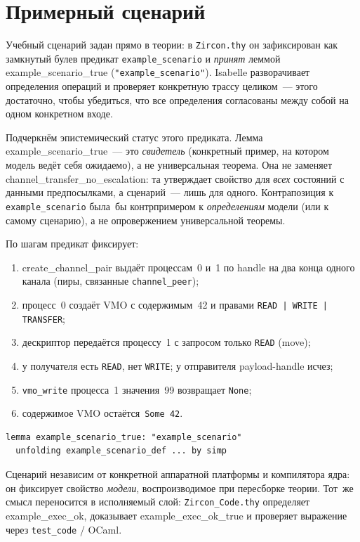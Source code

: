 \documentclass[11pt,a4paper]{article}
\newcommand{\isabel}[1]{{\isabelleit #1}}
\newcommand{\lemmaname}[1]{\isabel{#1}}
\begin{document}
\section{Примерный сценарий}

Учебный сценарий задан прямо в теории: в \texttt{Zircon.thy} он
зафиксирован как замкнутый булев предикат \texttt{example\_scenario}
и \emph{принят} леммой \lemmaname{example\_scenario\_true}
(\texttt{"example\_scenario"}). Isabelle разворачивает определения
операций и проверяет конкретную трассу целиком~--- этого достаточно,
чтобы убедиться, что все определения согласованы между собой на
одном конкретном входе.

Подчеркнём эпистемический статус этого предиката. Лемма
\lemmaname{example\_scenario\_true}~--- это \emph{свидетель}
(конкретный пример, на котором модель ведёт себя ожидаемо), а не
универсальная теорема. Она не заменяет
\lemmaname{channel\_transfer\_no\_escalation}: та утверждает свойство
для \emph{всех} состояний с данными предпосылками, а сценарий~---
лишь для одного. Контрапозиция к \texttt{example\_scenario} была~бы
контрпримером к \emph{определениям} модели (или к самому сценарию),
а не опровержением универсальной теоремы.

По шагам предикат фиксирует:
\begin{enumerate}[leftmargin=1.4em]
	\item \lemmaname{create\_channel\_pair} выдаёт процессам~0 и~1 по handle
	      на два конца одного канала (пиры, связанные \texttt{channel\_peer});
	\item процесс~0 создаёт VMO с содержимым~42 и правами
	      \texttt{READ\,|\,WRITE\,|\,TRANSFER};
	\item дескриптор передаётся процессу~1 с запросом только
	      \texttt{READ} (move);
	\item у получателя есть \texttt{READ}, нет \texttt{WRITE}; у отправителя
	      payload-handle исчез;
	\item \texttt{vmo\_write} процесса~1 значения~99 возвращает \texttt{None};
	\item содержимое VMO остаётся~\texttt{Some~42}.
\end{enumerate}

\begin{lstlisting}
lemma example_scenario_true: "example_scenario"
  unfolding example_scenario_def ... by simp
\end{lstlisting}

Сценарий независим от конкретной аппаратной платформы и компилятора
ядра: он фиксирует свойство \emph{модели}, воспроизводимое при
пересборке теории. Тот~же смысл переносится в
исполняемый слой: \texttt{Zircon\_Code.thy} определяет
\lemmaname{example\_exec\_ok}, доказывает
\lemmaname{example\_exec\_ok\_true} и проверяет выражение через
\texttt{test\_code} / OCaml.
\end{document}
